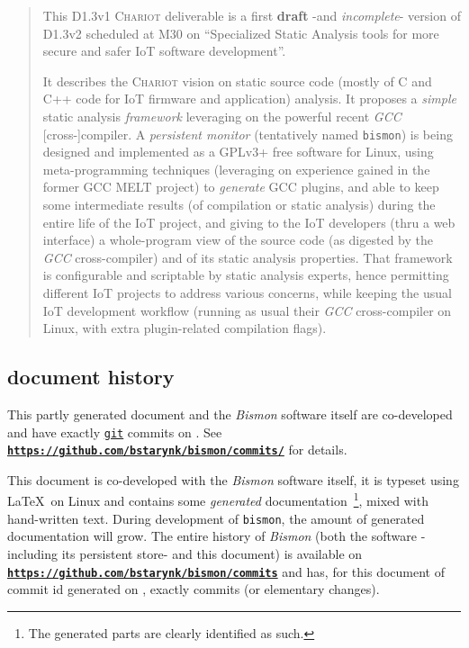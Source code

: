 \documentclass[11pt,a4paper]{article}
\newcommand{\bmurl}[1]{{\href{#1}{\texttt{\textbf{#1}}}}}
\begin{document}
\begin{titlepage}
\begin{abstract}
This D1.3v1 \textsc{Chariot} deliverable is a first \textbf{draft}
-and \emph{incomplete}- version of D1.3v2 scheduled at M30 on
``Specialized Static Analysis tools for more secure and safer IoT
software development''.

It describes the \textsc{Chariot} vision on static source code (mostly
of C and C++ code for IoT firmware and application) analysis. It
proposes a \emph{simple} static analysis \emph{framework} leveraging
on the powerful recent \emph{GCC} [cross-]compiler. A \emph{persistent
  monitor} (tentatively named \texttt{bismon}) is being designed and
implemented as a GPLv3+ free software for Linux, using
meta-programming techniques (leveraging on experience gained in the
former GCC MELT project) to \emph{generate} GCC plugins, and able to
keep some intermediate results (of compilation or static analysis)
during the entire life of the IoT project, and giving to the IoT
developers (thru a web interface) a whole-program view of the source
code (as digested by the \emph{GCC} cross-compiler) and of its static
analysis properties. That framework is configurable and scriptable by
static analysis experts, hence permitting different IoT projects to
address various concerns, while keeping the usual IoT development
workflow (running as usual their \emph{GCC} cross-compiler on Linux,
with extra plugin-related compilation flags).

\end{abstract}

\newpage


\subsection*{document history}
This partly generated document and the \emph{Bismon} software itself
are co-developed and have exactly {\bmgitnumbercommits} \href{http://git-scm.com/}{\texttt{git}}
commits on \textit{\bmdoctimestamp}. See
\bmurl{https://github.com/bstarynk/bismon/commits/} for details.

\begin{relsize}{-0.5}
This document is co-developed with the \emph{Bismon} software itself,
it is typeset using \LaTeX~on Linux and contains some \emph{generated}
documentation~\footnote{The generated parts are clearly identified as
  such.}, mixed with hand-written text. During development of
\texttt{bismon}, the amount of generated documentation will grow.  The
entire history of \emph{Bismon} (both the software -including its
persistent store- and this document) is available on
\bmurl{https://github.com/bstarynk/bismon/commits} and has, for this
document of commit id \texttt{\bmgitcommit} generated on
\textit{\bmdocdate}, exactly {\bmgitnumbercommits} commits (or
elementary changes).
\end{relsize}
\bigskip


\end{titlepage}
\end{document}
